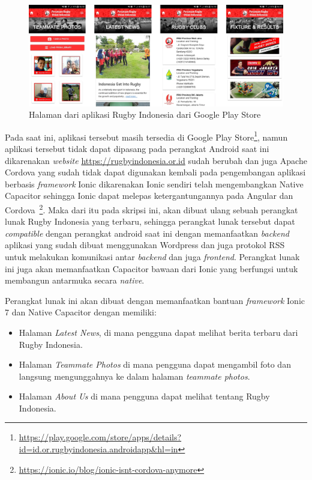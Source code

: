 \begin{figure} [!h]
    \centering
    \includegraphics[scale=0.725]{Gambar/Rugby-Indonesia-App-UI.png}
    \caption[Halaman aplikasi Rugby Indonesia]{Halaman dari aplikasi Rugby Indonesia dari Google Play Store}
    \label{fig:rugby-halaman-label}
\end{figure}

Pada saat ini, aplikasi tersebut masih tersedia di Google Play Store\footnote{\url{https://play.google.com/store/apps/details?id=id.or.rugbyindonesia.androidapp\&hl=in}}, namun aplikasi tersebut tidak dapat dipasang pada perangkat Android saat ini dikarenakan \textit{website} \url{https://rugbyindonesia.or.id} sudah berubah dan juga Apache Cordova yang sudah tidak dapat digunakan kembali pada pengembangan aplikasi berbasis \textit{framework} Ionic dikarenakan Ionic sendiri telah mengembangkan Native Capacitor sehingga Ionic dapat melepas ketergantungannya pada Angular dan Cordova~\footnote{\url{https://ionic.io/blog/ionic-isnt-cordova-anymore}}. Maka dari itu pada skripsi ini, akan dibuat ulang sebuah perangkat lunak Rugby Indonesia yang terbaru, sehingga perangkat lunak tersebut dapat \textit{compatible} dengan perangkat android saat ini dengan memanfaatkan \textit{backend} aplikasi yang sudah dibuat menggunakan Wordpress dan juga protokol RSS untuk melakukan komunikasi antar \textit{backend} dan juga \textit{frontend}. Perangkat lunak ini juga akan memanfaatkan Capacitor bawaan dari Ionic yang berfungsi untuk membangun antarmuka secara \textit{native}.

Perangkat lunak ini akan dibuat dengan memanfaatkan bantuan {\it framework} Ionic 7 dan Native Capacitor dengan memiliki:
\begin{itemize}
    \item Halaman \textit{Latest News}, di mana pengguna dapat melihat berita terbaru dari Rugby Indonesia.
    \item Halaman \textit{Teammate Photos} di mana pengguna dapat mengambil foto dan langsung mengunggahnya ke dalam halaman \textit{teammate photos}.
    \item Halaman \textit{About Us} di mana pengguna dapat melihat tentang Rugby Indonesia.
\end{itemize}


